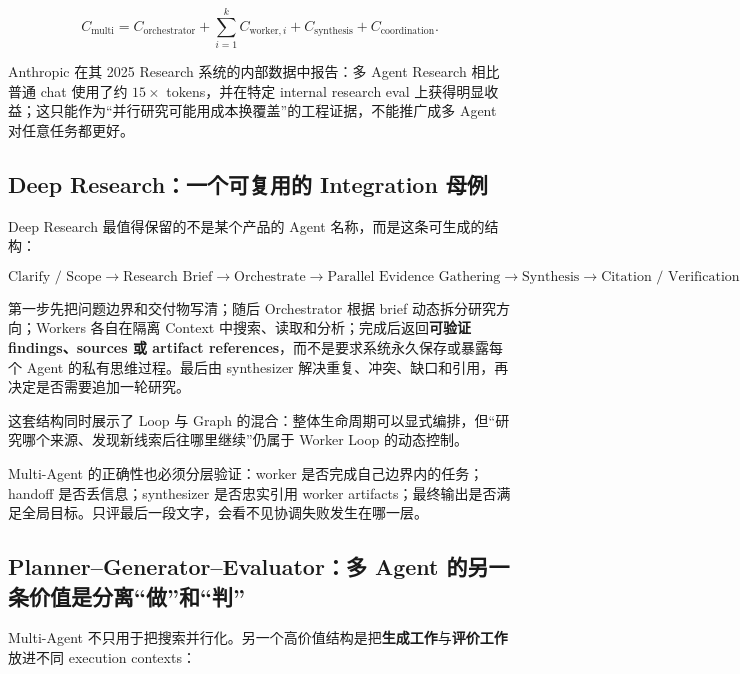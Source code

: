 \documentclass[profile=standard,twoside=false]{ipara-handbook}
\begin{document}
$$
C_{\text{multi}}
= C_{\text{orchestrator}}
+\sum_{i=1}^{k} C_{\text{worker},i}
+C_{\text{synthesis}}
+C_{\text{coordination}}.
$$

Anthropic 在其 2025 Research 系统的内部数据中报告：多 Agent Research 相比普通 chat 使用了约 $15\times$ tokens，并在特定 internal research eval 上获得明显收益；这只能作为“并行研究可能用成本换覆盖”的工程证据，不能推广成多 Agent 对任意任务都更好。

\subsection{Deep Research：一个可复用的 Integration 母例}

Deep Research 最值得保留的不是某个产品的 Agent 名称，而是这条可生成的结构：

$$
\boxed{
\text{Clarify / Scope}
\to\text{Research Brief}
\to\text{Orchestrate}
\to\text{Parallel Evidence Gathering}
\to\text{Synthesis}
\to\text{Citation / Verification}
}
$$

第一步先把问题边界和交付物写清；随后 Orchestrator 根据 brief 动态拆分研究方向；Workers 各自在隔离 Context 中搜索、读取和分析；完成后返回\textbf{可验证 findings、sources 或 artifact references}，而不是要求系统永久保存或暴露每个 Agent 的私有思维过程。最后由 synthesizer 解决重复、冲突、缺口和引用，再决定是否需要追加一轮研究。

这套结构同时展示了 Loop 与 Graph 的混合：整体生命周期可以显式编排，但“研究哪个来源、发现新线索后往哪里继续”仍属于 Worker Loop 的动态控制。

Multi-Agent 的正确性也必须分层验证：worker 是否完成自己边界内的任务；handoff 是否丢信息；synthesizer 是否忠实引用 worker artifacts；最终输出是否满足全局目标。只评最后一段文字，会看不见协调失败发生在哪一层。

\subsection{Planner--Generator--Evaluator：多 Agent 的另一条价值是分离“做”和“判”}

Multi-Agent 不只用于把搜索并行化。另一个高价值结构是把\textbf{生成工作}与\textbf{评价工作}放进不同 execution contexts：

\begin{processchain}
\end{processchain}
\end{document}
